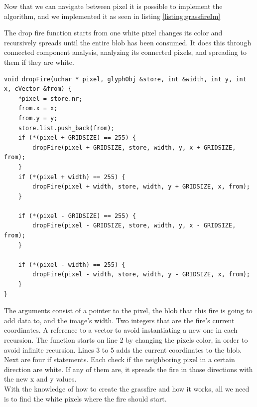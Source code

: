  Now that we can navigate between pixel it is possible to implement the algorithm, and we implemented it as seen in listing \ref{listing:grassfireIm}
\begin{listing}[H]
	\caption{The drop fire function starts from one white pixel changes its color and recursively spreads until the entire blob has been consumed. It does this through connected component analysis, analyzing its connected pixels, and spreading to them if they are white.}
	\begin{verbatim}
void dropFire(uchar * pixel, glyphObj &store, int &width, int y, int x, cVector &from) {
	*pixel = store.nr;
	from.x = x;
	from.y = y;
	store.list.push_back(from);
	if (*(pixel + GRIDSIZE) == 255) {
		dropFire(pixel + GRIDSIZE, store, width, y, x + GRIDSIZE, from);
	}
	if (*(pixel + width) == 255) {
		dropFire(pixel + width, store, width, y + GRIDSIZE, x, from);
	}
	
	if (*(pixel - GRIDSIZE) == 255) {
		dropFire(pixel - GRIDSIZE, store, width, y, x - GRIDSIZE, from);
	}
	
	if (*(pixel - width) == 255) {
		dropFire(pixel - width, store, width, y - GRIDSIZE, x, from);
	}
}
	\end{verbatim}
	\label{listing:grassfireIm}
\end{listing} 
The arguments consist of a pointer to the pixel, the blob that this fire is going to add data to, and the image's width. Two integers that are the fire's current coordinates. A reference to a vector to avoid instantiating a new one in each recursion. The function starts on line 2 by changing the pixels color, in order to avoid infinite recursion. Lines 3 to 5 adds the current coordinates to the blob. Next are four if statements. Each check if the neighboring pixel in a certain direction are white. If any of them are, it spreads the fire in those directions with the new x and y values.\\
With the knowledge of how to create the grassfire and how it works, all we need is to find the white pixels where the fire should start.

